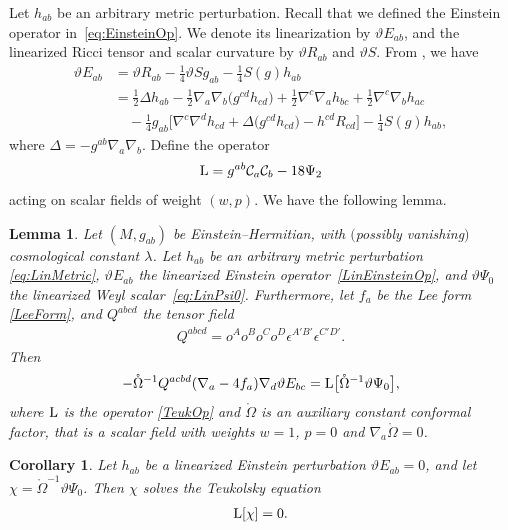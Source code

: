 \documentclass[10pt,a4paper]{amsart}
\numberwithin{equation}{section}
\newtheorem{Corollary}[Theorem]{Corollary}
\newtheorem{Lemma}[Theorem]{Lemma}
\begin{document}
Let $h_{ab}$ be an arbitrary metric perturbation. Recall that we defined the Einstein operator in~\eqref{eq:EinsteinOp}. We denote its linearization by $\vartheta{E}_{ab}$, and the linearized Ricci tensor and scalar curvature by $\vartheta R_{ab}$ and $\vartheta S$. From \cite[Theorem~1.174]{MR2371700}, we have
\begin{align}
\vartheta E_{ab} &{}= \vartheta R_{ab} - \frac{1}{4}\vartheta S g_{ab} - \frac{1}{4}S(g)h_{ab} \nonumber\\
&{}= \frac{1}{2}\Delta h_{ab} - \frac{1}{2}\nabla_{a}\nabla_{b}\bigl(g^{cd}h_{cd}\bigr) + \frac{1}{2}\nabla^{c}\nabla_{a}h_{bc} + \frac{1}{2}\nabla^{c} \nabla_{b}h_{ac} \nonumber\\
&\quad{} - \frac{1}{4}g_{ab}\bigl[ \nabla^{c}\nabla^{d}h_{cd} + \Delta\bigl(g^{cd}h_{cd}\bigr) - h^{cd}R_{cd} \bigr]
-\frac{1}{4}S(g) h_{ab},\label{LinEinsteinOp}
\end{align}
where $\Delta=-g^{ab}\nabla_{a}\nabla_{b}$. Define the operator
\begin{align}\label{TeukOp}
 {\rm L}=g^{ab}\mathcal{C}_{a}\mathcal{C}_{b}-18\Psi_{2}
\end{align}
acting on scalar fields of weight $(w,p)$. We have the following lemma.
\begin{Lemma}\label{lem:OpId}
Let $(M,g_{ab})$ be Einstein--Hermitian, with $($possibly vanishing$)$ cosmological constant $\lambda$. Let $h_{ab}$ be an arbitrary metric perturbation \eqref{eq:LinMetric}, $\vartheta{E}_{ab}$ the linearized Einstein operator~\eqref{LinEinsteinOp}, and $\vartheta\Psi_0$ the linearized Weyl scalar~\eqref{eq:LinPsi0}. Furthermore, let $f_{a}$ be the Lee form \eqref{LeeForm}, and $Q^{abcd}$ the tensor field
\begin{align}\label{tensorQ}
Q^{abcd} = o^{A}o^{B}o^{C}o^{D}\epsilon^{A'B'}\epsilon^{C'D'}.
\end{align}
Then
\begin{align}\label{eq:OpIdentity}
-\mathring{\Omega}^{-1}Q^{acbd}(\nabla_{a}-4f_{a})\nabla_{d}\vartheta E_{bc} = {\rm L}\bigl[\mathring{\Omega}^{-1}\vartheta\Psi_0\bigr],
\end{align}
where ${\rm L}$ is the operator \eqref{TeukOp} and $\mathring{\Omega}$ is an auxiliary constant conformal factor, that is a scalar field with weights $w=1$, $p=0$ and $\nabla_{a}\mathring\Omega=0$.
\end{Lemma}

\begin{Corollary}\label{item:teuk}
Let $h_{ab}$ be a linearized Einstein perturbation $\vartheta E_{ab}=0$, and let $\chi=\mathring{\Omega}^{-1}\vartheta\Psi_0$. Then $\chi$ solves the Teukolsky equation
\begin{align} \label{TeukEq}
{\rm L}[\chi] = 0.
\end{align}
\end{Corollary}
\end{document}
